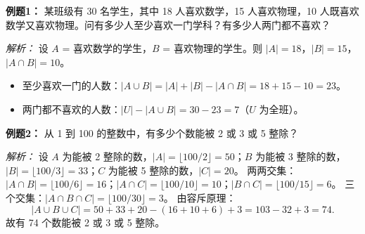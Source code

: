 \begin{examplebox}
\textbf{例题1：} 某班级有 30 名学生，其中 18 人喜欢数学，15 人喜欢物理，10 人既喜欢数学又喜欢物理。问有多少人至少喜欢一门学科？有多少人两门都不喜欢？

\textit{解析：} 设 $A$ = 喜欢数学的学生，$B$ = 喜欢物理的学生。则 $|A|=18$，$|B|=15$，$|A \cap B|=10$。
\begin{itemize}
    \item 至少喜欢一门的人数：$|A \cup B| = |A| + |B| - |A \cap B| = 18+15-10 = 23$。
    \item 两门都不喜欢的人数：$|U| - |A \cup B| = 30 - 23 = 7$（$U$ 为全班）。
\end{itemize}
\end{examplebox}

\begin{examplebox}
\textbf{例题2：} 从 1 到 100 的整数中，有多少个数能被 2 或 3 或 5 整除？

\textit{解析：} 设 $A$ 为能被 2 整除的数，$|A| = \lfloor 100/2 \rfloor = 50$；$B$ 为能被 3 整除的数，$|B| = \lfloor 100/3 \rfloor = 33$；$C$ 为能被 5 整除的数，$|C| = 20$。
两两交集：$|A \cap B| = \lfloor 100/6 \rfloor = 16$；$|A \cap C| = \lfloor 100/10 \rfloor = 10$；$|B \cap C| = \lfloor 100/15 \rfloor = 6$。
三个交集：$|A \cap B \cap C| = \lfloor 100/30 \rfloor = 3$。
由容斥原理：
\[
|A \cup B \cup C| = 50+33+20 - (16+10+6) + 3 = 103 - 32 + 3 = 74.
\]
故有 74 个数能被 2 或 3 或 5 整除。
\end{examplebox}
